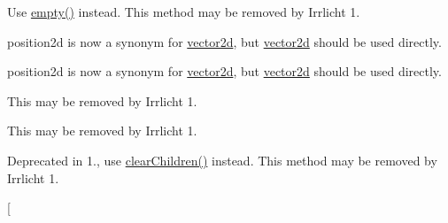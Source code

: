 
\begin{DoxyRefList}
\item[\label{deprecated__deprecated000017}%
\Hypertarget{deprecated__deprecated000017}%
Member \hyperlink{classirr_1_1core_1_1map_a2a5b309f8737e2aca9668e32c71f05ed}{irr\+:\+:core\+:\+:map$<$ Key\+Type, Value\+Type $>$\+:\+:is\+Empty} () const]Use \hyperlink{classirr_1_1core_1_1map_a253070a62165cc9881cc75bc774f7034}{empty()} instead. This method may be removed by Irrlicht 1.  
\item[\label{deprecated__deprecated000025}%
\Hypertarget{deprecated__deprecated000025}%
Member \hyperlink{namespaceirr_1_1core_ad9a4cf4ed6b9e8763ffd6656121fd32e}{irr\+:\+:core\+:\+:position2df} ]position2d is now a synonym for \hyperlink{classirr_1_1core_1_1vector2d}{vector2d}, but \hyperlink{classirr_1_1core_1_1vector2d}{vector2d} should be used directly.  
\item[\label{deprecated__deprecated000026}%
\Hypertarget{deprecated__deprecated000026}%
Member \hyperlink{namespaceirr_1_1core_a3643c2cc7820dd78cd87e73a46b92145}{irr\+:\+:core\+:\+:position2di} ]position2d is now a synonym for \hyperlink{classirr_1_1core_1_1vector2d}{vector2d}, but \hyperlink{classirr_1_1core_1_1vector2d}{vector2d} should be used directly.  
\item[\label{deprecated__deprecated000006}%
\Hypertarget{deprecated__deprecated000006}%
Member \hyperlink{namespaceirr_1_1gui_a27be6aa12d4985a5005983182fe99d56aab6c80b0456e769a61cfd71f3e3ed742}{irr\+:\+:gui\+:\+:E\+G\+D\+S\+\_\+\+M\+E\+S\+S\+A\+G\+E\+\_\+\+B\+O\+X\+\_\+\+H\+E\+I\+G\+HT} ]This may be removed by Irrlicht 1.  
\item[\label{deprecated__deprecated000005}%
\Hypertarget{deprecated__deprecated000005}%
Member \hyperlink{namespaceirr_1_1gui_a27be6aa12d4985a5005983182fe99d56a1ffa7fffc987d32b85096fadc709516e}{irr\+:\+:gui\+:\+:E\+G\+D\+S\+\_\+\+M\+E\+S\+S\+A\+G\+E\+\_\+\+B\+O\+X\+\_\+\+W\+I\+D\+TH} ]This may be removed by Irrlicht 1.  
\item[\label{deprecated__deprecated000007}%
\Hypertarget{deprecated__deprecated000007}%
Member \hyperlink{classirr_1_1gui_1_1IGUITreeViewNode_a6c431404c8e36eb565f033c1e1dce247}{irr\+:\+:gui\+:\+:I\+G\+U\+I\+Tree\+View\+Node\+:\+:clear\+Childs} ()]Deprecated in 1., use \hyperlink{classirr_1_1gui_1_1IGUITreeViewNode_a0bc4702930d1ddb25b895c7176f5f459}{clear\+Children()} instead. This method may be removed by Irrlicht 1.  
\item[\label{deprecated__deprecated000008}%
%

\end{DoxyRefList}
